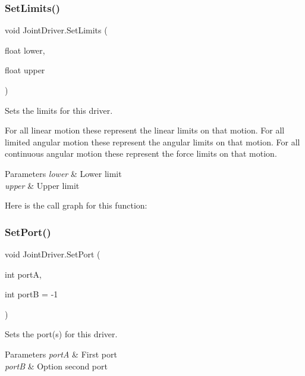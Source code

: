 \subsubsection{\texorpdfstring{Set\+Limits()}{SetLimits()}}
{\footnotesize\ttfamily void Joint\+Driver.\+Set\+Limits (\begin{DoxyParamCaption}\item[{float}]{lower,  }\item[{float}]{upper }\end{DoxyParamCaption})}



Sets the limits for this driver. 

For all linear motion these represent the linear limits on that motion. For all limited angular motion these represent the angular limits on that motion. For all continuous angular motion these represent the force limits on that motion. 


\begin{DoxyParams}{Parameters}
{\em lower} & Lower limit\\
\hline
{\em upper} & Upper limit\\
\hline
\end{DoxyParams}
Here is the call graph for this function\+:
\mbox{\label{class_joint_driver_ae1758d47d4b9142ce00e0b1b4da8a26d}} 
\subsubsection{\texorpdfstring{Set\+Port()}{SetPort()}}
{\footnotesize\ttfamily void Joint\+Driver.\+Set\+Port (\begin{DoxyParamCaption}\item[{int}]{portA,  }\item[{int}]{portB = {\ttfamily -\/1} }\end{DoxyParamCaption})}



Sets the port(s) for this driver. 


\begin{DoxyParams}{Parameters}
{\em portA} & First port\\
\hline
{\em portB} & Option second port\\
\hline
\end{DoxyParams}
\mbox{\label{class_joint_driver_a36d6deba7dec0475dc06ab5d87c3e7e2}} 

